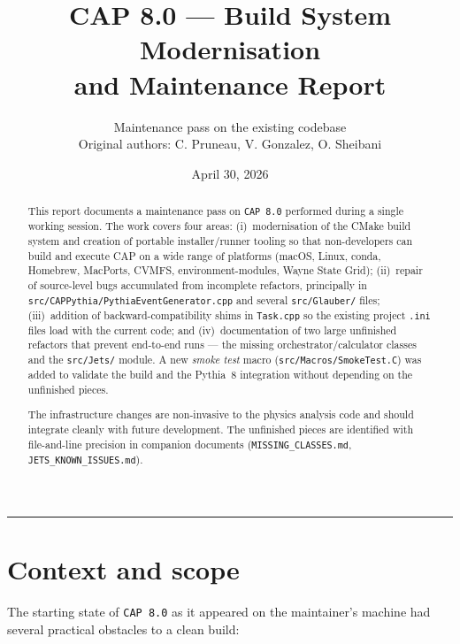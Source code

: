 \documentclass[11pt,a4paper]{article}
\title{\textbf{CAP 8.0 — Build System Modernisation\\and Maintenance Report}}
\author{Maintenance pass on the existing codebase\\\small Original authors: C. Pruneau, V. Gonzalez, O. Sheibani}
\date{April 30, 2026}
\begin{document}
\maketitle

\begin{abstract}
\noindent
This report documents a maintenance pass on \texttt{CAP~8.0} performed during
a single working session. The work covers four areas: (i)~modernisation of the
CMake build system and creation of portable installer/runner tooling so that
non-developers can build and execute CAP on a wide range of platforms (macOS,
Linux, conda, Homebrew, MacPorts, CVMFS, environment-modules, Wayne State Grid);
(ii)~repair of source-level bugs accumulated from incomplete refactors,
principally in \texttt{src/CAPPythia/PythiaEventGenerator.cpp} and several
\texttt{src/Glauber/} files; (iii)~addition of backward-compatibility shims in
\texttt{Task.cpp} so the existing project \texttt{.ini} files load with the
current code; and (iv)~documentation of two large unfinished refactors that
prevent end-to-end runs --- the missing orchestrator/calculator classes and
the \texttt{src/Jets/} module. A new \emph{smoke test} macro
(\texttt{src/Macros/SmokeTest.C}) was added to validate the build and the
Pythia~8 integration without depending on the unfinished pieces.

The infrastructure changes are non-invasive to the physics analysis code and
should integrate cleanly with future development. The unfinished pieces are
identified with file-and-line precision in companion documents
(\texttt{MISSING\_CLASSES.md}, \texttt{JETS\_KNOWN\_ISSUES.md}).
\end{abstract}

\tableofcontents
\vspace{1em}
\hrule
\vspace{1em}

\section{Context and scope}

The starting state of \texttt{CAP~8.0} as it appeared on the maintainer's
machine had several practical obstacles to a clean build:
\end{document}
